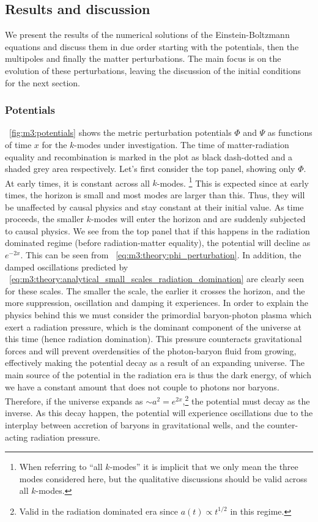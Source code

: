\subsection{Results and discussion}\label{sec:m3:results}
    We present the results of the numerical solutions of the Einstein-Boltzmann equations and discuss them in due order starting with the potentials, then the multipoles and finally the matter perturbations. The main focus is on the evolution of these perturbations, leaving the discussion of the initial conditions for the next section. 

\subsubsection{Potentials}
    ~\cref{fig:m3:potentials} shows the metric perturbation potentials $\Phi$ and $\Psi$ as functions of time $x$ for the $k$-modes under investigation. The time of matter-radiation equality and recombination is marked in the plot as black dash-dotted and a shaded grey area respectively. Let's first consider the top panel, showing only $\Phi$. At early times, it is constant across all $k$-modes. \footnote{When referring to ``all $k$-modes'' it is implicit that we only mean the three modes considered here, but the qualitative discussions should be valid across all $k$-modes.} This is expected since at early times, the horizon is small and most modes are larger than this. Thus, they will be unaffected by causal physics and stay constant at their initial value. As time proceeds, the smaller $k$-modes will enter the horizon and are suddenly subjected to causal physics. We see from the top panel that if this happens in the radiation dominated regime (before radiation-matter equality), the potential will decline as $e^{-2x}$. This can be seen from ~\cref{eq:m3:theory:phi_perturbation}. In addition, the damped oscillations predicted by ~\cref{eq:m3:theory:analytical_small_scales_radiation_domination} are clearly seen for these scales. The smaller the scale, the earlier it crosses the horizon, and the more suppression, oscillation and damping it experiences. In order to explain the physics behind this we must consider the primordial baryon-photon plasma which exert a radiation pressure, which is the dominant component of the universe at this time (hence radiation domination). This pressure counteracts gravitational forces and will prevent overdensities of the photon-baryon fluid from growing, effectively making the potential decay as a result of an expanding universe. The main source of the potential in the radiation era is thus the dark energy, of which we have a constant amount that does not couple to photons nor baryons. Therefore, if the universe expands as $\sim a^2=e^{2x}$,\footnote{Valid in the radiation dominated era since $a(t) \propto t^{1/2}$ in this regime.} the potential must decay as the inverse. As this decay happen, the potential will experience oscillations due to the interplay between accretion of baryons in gravitational wells, and the counter-acting radiation pressure.  
    
